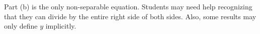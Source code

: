 \documentclass[noinstructornotes]{ximera}
\begin{document}
\begin{problem}
\end{problem}

\begin{instructorNotes}
Part (b) is the only non-separable equation.  
Students may need help recognizing that they can divide by the entire right side of both sides.  
Also, some results may only define $y$ implicitly.
\end{instructorNotes}


	
	
	
	
	
	
	
	
	

	










								
				
				
	
\end{document}
